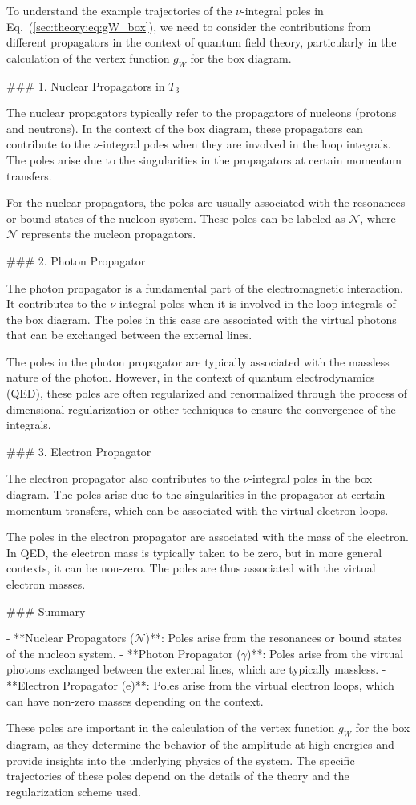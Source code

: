 To understand the example trajectories of the \(\nu\)-integral poles in Eq.~(\ref{sec:theory:eq:gW_box}), we need to consider the contributions from different propagators in the context of quantum field theory, particularly in the calculation of the vertex function \(g_W\) for the box diagram.

### 1. Nuclear Propagators in \(T_3\)

The nuclear propagators typically refer to the propagators of nucleons (protons and neutrons). In the context of the box diagram, these propagators can contribute to the \(\nu\)-integral poles when they are involved in the loop integrals. The poles arise due to the singularities in the propagators at certain momentum transfers.

For the nuclear propagators, the poles are usually associated with the resonances or bound states of the nucleon system. These poles can be labeled as \(\mathcal{N}\), where \(\mathcal{N}\) represents the nucleon propagators.

### 2. Photon Propagator

The photon propagator is a fundamental part of the electromagnetic interaction. It contributes to the \(\nu\)-integral poles when it is involved in the loop integrals of the box diagram. The poles in this case are associated with the virtual photons that can be exchanged between the external lines.

The poles in the photon propagator are typically associated with the massless nature of the photon. However, in the context of quantum electrodynamics (QED), these poles are often regularized and renormalized through the process of dimensional regularization or other techniques to ensure the convergence of the integrals.

### 3. Electron Propagator

The electron propagator also contributes to the \(\nu\)-integral poles in the box diagram. The poles arise due to the singularities in the propagator at certain momentum transfers, which can be associated with the virtual electron loops.

The poles in the electron propagator are associated with the mass of the electron. In QED, the electron mass is typically taken to be zero, but in more general contexts, it can be non-zero. The poles are thus associated with the virtual electron masses.

### Summary

- **Nuclear Propagators (\(\mathcal{N}\))**: Poles arise from the resonances or bound states of the nucleon system.
- **Photon Propagator (\(\gamma\))**: Poles arise from the virtual photons exchanged between the external lines, which are typically massless.
- **Electron Propagator (e)**: Poles arise from the virtual electron loops, which can have non-zero masses depending on the context.

These poles are important in the calculation of the vertex function \(g_W\) for the box diagram, as they determine the behavior of the amplitude at high energies and provide insights into the underlying physics of the system. The specific trajectories of these poles depend on the details of the theory and the regularization scheme used.
